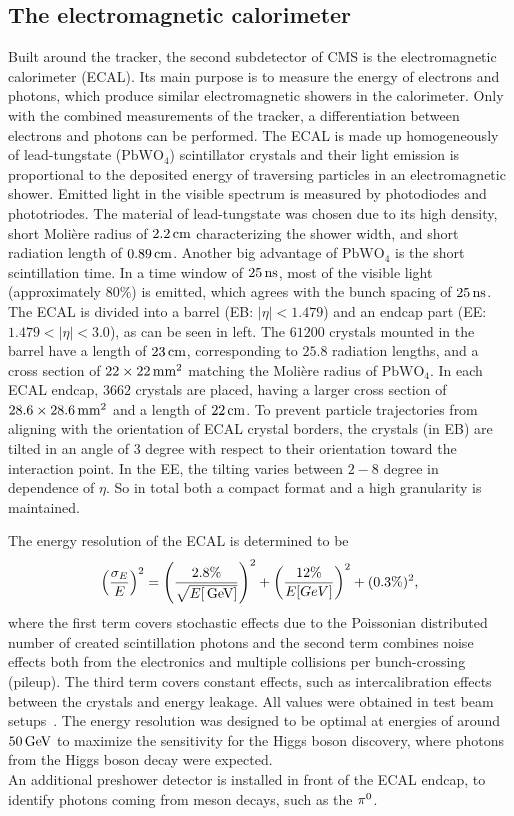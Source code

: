 \subsection{The electromagnetic calorimeter}
Built around the tracker, the second subdetector of CMS is the electromagnetic calorimeter (ECAL). Its main purpose is to measure the energy of electrons and photons, which produce similar electromagnetic showers in the calorimeter. Only with the combined measurements of the tracker, a differentiation between electrons and photons can be performed. The ECAL is made up homogeneously of lead-tungstate ($\mathrm{PbWO_4}$) scintillator crystals and their light emission is proportional to the deposited energy of traversing particles in an electromagnetic shower. Emitted light in the visible spectrum is measured by photodiodes and phototriodes. The material of lead-tungstate was chosen due to its high density, short Moli\`{e}re radius of $2.2\,\text{cm}$ characterizing the shower width, and short radiation length of $0.89\,\text{cm}$. Another big advantage of $\mathrm{PbWO_4}$ is the short scintillation time. In a time window of $25\,\text{ns}$, most of the visible light (approximately $80\%$) is emitted, which agrees with the bunch spacing of $25\,\text{ns}$. The ECAL is divided into a barrel (EB: $|\eta|<1.479$) and an endcap part (EE: $1.479<|\eta|<3.0$), as can be seen in  left. The $61200$ crystals mounted in the barrel have a length of $23\,\text{cm}$, corresponding to $25.8$ radiation lengths, and a cross section of $22\times22\,\text{mm}^2$ matching the Moli\`{e}re radius of $\mathrm{PbWO_4}$. In each ECAL endcap, $3662$ crystals are placed, having a larger cross section of $ 28.6\times28.6\,\text{mm}^2$ and a length of $22\,\text{cm}$.
To prevent particle trajectories from aligning with the orientation of ECAL crystal borders, the crystals (in EB) are tilted in an angle of $3$ degree with respect to their orientation toward the interaction point. In the EE, the tilting varies between $2-8$ degree in dependence of $\eta$. So in total both a compact format and a high granularity is maintained.

The energy resolution of the ECAL is determined to be
\begin{equation}
 \left(\frac{\sigma_E}{E}\right)^2=\left(\frac{2.8\%}{\sqrt{E[\,\text{Ge\hspace{-.08em}V}]}}\right)^2 + \left(\frac{12\%}{E[GeV]}\right)^2 + (0.3\%)^2,
\end{equation}
where the first term covers stochastic effects due to the Poissonian distributed number of created scintillation photons and the second term combines noise effects both from the electronics and multiple collisions per bunch-crossing (pileup). The third term covers constant effects, such as intercalibration effects between the crystals and energy leakage. All values were obtained in test beam setups~\cite{ECALRes}. The energy resolution was designed to be optimal at energies of around $50\,\text{Ge\hspace{-.08em}V}$ to maximize the sensitivity for the Higgs boson discovery, where photons from the Higgs boson decay were expected.\\
An additional preshower detector is installed in front of the ECAL endcap, to identify photons coming from meson decays, such as the $\pi^0$.

